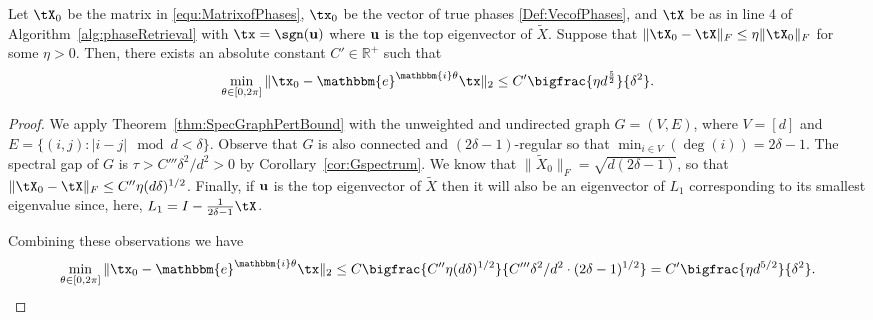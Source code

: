 \begin{cor}
Let $\tX_0$ be the matrix in \eqref{equ:MatrixofPhases}, $\tx_0$ be the vector of true phases \eqref{Def:VecofPhases}, and $\tX$ be as in line 4 of Algorithm~\ref{alg:phaseRetrieval} with $\tx = \sgn({\bf u})$ where ${\bf u}$ is the top eigenvector of $\widetilde{X}$. Suppose that 
$\Vert \tX_0 - \tX \Vert_F \le \eta \Vert \tX_0 \Vert_F$ for some $\eta>0$.  Then, there exists an absolute constant $C' \in \mathbb{R}^+$ such that
\[\min_{\theta\in[0,2\pi]} \Vert \tx_0 - \mathbbm{e}^{\mathbbm{i}\theta} \tx \Vert_2 \le C' \bigfrac{\eta d^\frac{5}{2}}{\delta^{2}}.\]
\label{cor:GenBoundv2}
\end{cor}

\begin{proof}
 We apply Theorem~\ref{thm:SpecGraphPertBound} with the unweighted and undirected graph $G = (V, E)$, where $V = [d]$ and $E = \{(i, j) : |i - j| \mod d < \delta\}$.  Observe that $G$ is also connected and $(2\delta - 1)$-regular so that $\min_{i \in V}(\deg(i)) = 2\delta - 1$.  The spectral gap of $G$ is $\tau > C'''\delta^2 / d^2 > 0$ by Corollary~\ref{cor:Gspectrum}.  We know that $\| \widetilde{X}_0 \|_F = \sqrt{d(2\delta - 1)}$, so that $\| \tX_0 - \tX \|_{F} \le C'' \eta (d \delta)^{1/2}$.  Finally, if ${\bf u}$ is the top eigenvector of $\widetilde{X}$ then it will also be an eigenvector of $L_1$ corresponding to its smallest eigenvalue since, here, $L_1 = I - \frac{1}{2 \delta - 1} \tX $.

Combining these observations we have \[\min_{\theta\in[0,2\pi]} \Vert \tx_0 - \mathbbm{e}^{\mathbbm{i}\theta} \tx \Vert_2 \le C \bigfrac{C'' \eta (d \delta)^{1/2}}{C''' \delta^2 / d^2 \cdot (2 \delta - 1)^{1/2}} = C' \bigfrac{\eta d^{5/2}}{\delta^2}.\]
\end{proof}
